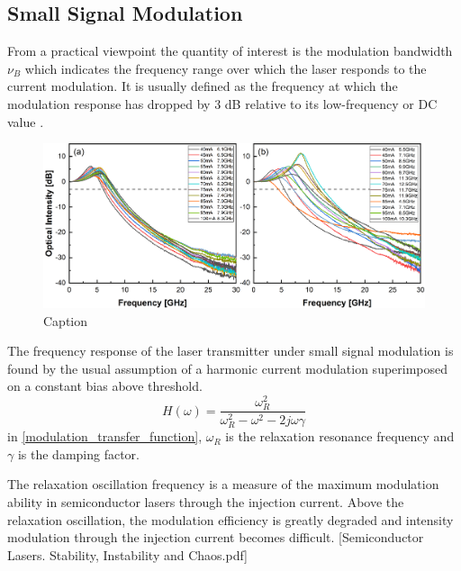 \subsection{Small Signal Modulation}
From a practical viewpoint the quantity of interest is the modulation bandwidth $\nu_B$ which indicates the frequency range over which the laser responds to the current modulation. It is usually defined as the frequency at which the modulation response has dropped by 3 dB relative to its low-frequency or DC value \cite{agrawal2013semiconductor}.
\begin{figure}[ht]
    \centering
    \includegraphics[width=\linewidth]{figures/bandwidth_gain_scan_cleaved_and_lensed_grating_4679.png}
    \caption{Caption}
    \label{fig:bandwidth_gain_scan_cleaved_and_lensed}
\end{figure}

The frequency response of the laser transmitter under small signal modulation is found by the usual assumption of a harmonic current modulation superimposed on a constant bias above threshold.
\begin{equation}
    H(\omega)=\frac{\omega_R^2}{\omega_R^2-\omega^2-2j\omega\gamma}
    \label{modulation_transfer_function}
\end{equation}
in \autoref{modulation_transfer_function}, $\omega_R$ is the relaxation resonance frequency and $\gamma$ is the damping factor.

The relaxation oscillation frequency is a measure of the maximum modulation ability in semiconductor lasers through the injection current. Above the relaxation oscillation, the modulation efficiency is greatly degraded and intensity modulation through the injection current becomes difficult. [Semiconductor Lasers. Stability, Instability and Chaos.pdf]

